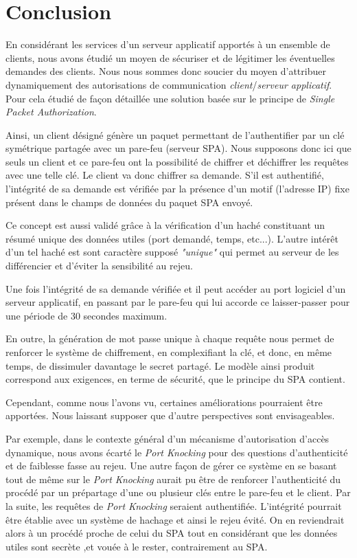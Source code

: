 \chapter*{Conclusion}
En considérant les services d'un serveur applicatif apportés à un ensemble de clients, nous avons étudié un moyen de sécuriser et de légitimer les éventuelles demandes des clients.
Nous nous sommes donc soucier du moyen d'attribuer dynamiquement des autorisations de communication \emph{client}/\emph{serveur applicatif}. Pour cela étudié de façon détaillée une solution basée sur le principe de \emph{Single Packet Authorization}.

Ainsi, un client désigné génère un paquet permettant de l'authentifier par un clé symétrique partagée avec un pare-feu (serveur SPA). Nous supposons donc ici que seuls un client et ce pare-feu ont la possibilité de chiffrer et déchiffrer les requêtes avec une telle clé. Le client va donc chiffrer sa demande. S'il est authentifié, l'intégrité de sa demande est vérifiée par la présence d'un motif (l'adresse IP) fixe présent dans le champs de données du paquet SPA envoyé.

Ce concept est aussi validé grâce à la vérification d'un haché constituant un résumé unique des données utiles (port demandé, temps, etc...). L'autre intérêt d'un tel haché est sont caractère supposé \emph{"unique"} qui permet au serveur de les différencier et d'éviter la sensibilité au rejeu.

Une fois l'intégrité de sa demande vérifiée et il peut accéder au port logiciel d'un serveur applicatif, en passant par le pare-feu qui lui accorde ce laisser-passer pour une période de 30 secondes maximum.

En outre, la génération de mot passe unique à chaque requête nous permet de renforcer le système de chiffrement, en complexifiant la clé, et donc, en même temps, de dissimuler davantage le secret partagé.
Le modèle ainsi produit correspond aux exigences, en terme de sécurité, que le principe du SPA contient.

Cependant, comme nous l'avons vu, certaines améliorations pourraient être apportées. Nous laissant supposer que d'autre perspectives sont envisageables.

Par exemple, dans le contexte général d'un mécanisme d'autorisation d'accès dynamique, nous avons écarté le \emph{Port Knocking} pour des questions d'authenticité et de faiblesse fasse au rejeu. 
Une autre façon de gérer ce système en se basant tout de même sur le \emph{Port Knocking} aurait pu être de renforcer l'authenticité du procédé par un prépartage d'une ou plusieur clés entre le pare-feu et le client. Par la suite, les requêtes de \emph{Port Knocking} seraient authentifiée. L'intégrité pourrait être établie avec un système de hachage et ainsi le rejeu évité.
On en reviendrait alors à un procédé proche de celui du SPA tout en considérant que les données utiles sont secrète ,et vouée à le rester, contrairement au SPA.

